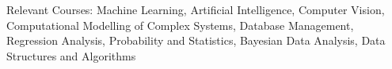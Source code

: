 
Relevant Courses: Machine Learning, Artificial Intelligence, Computer Vision, Computational Modelling of Complex Systems, Database Management, Regression Analysis, Probability and Statistics, Bayesian Data Analysis, Data Structures and Algorithms

